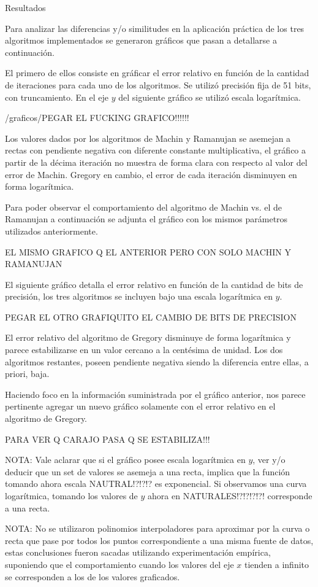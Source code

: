 \begin{section}{Resultados}

	Para analizar las diferencias y/o similitudes en la aplicación práctica de los tres algoritmos implementados se generaron gráficos que pasan a detallarse a continuación. 
		
	El primero de ellos consiste en gráficar el error relativo en función de la cantidad de iteraciones para cada uno de los algoritmos. Se utilizó precisión fija de 51 bits, con truncamiento. En el eje $y$ del siguiente gráfico se utilizó escala logarítmica.

	/graficos/PEGAR EL FUCKING GRAFICO!!!!!!

	Los valores dados por los algoritmos de Machin y Ramanujan se asemejan a rectas con pendiente negativa con diferente constante multiplicativa, el gráfico a partir de la décima iteración no muestra de forma clara con respecto al valor del error de Machin. Gregory en cambio, el error de cada iteración disminuyen en forma logarítmica.
	
	Para poder observar el comportamiento del algoritmo de Machin vs. el de Ramanujan a continuación se adjunta el gráfico con los mismos parámetros utilizados anteriormente.

	EL MISMO GRAFICO Q EL ANTERIOR PERO CON SOLO MACHIN Y RAMANUJAN

	El siguiente gráfico detalla el error relativo en función de la cantidad de bits de precisión, los tres algoritmos se incluyen bajo una escala logarítmica en $y$. 

	PEGAR EL OTRO GRAFIQUITO EL CAMBIO DE BITS DE PRECISION

	El error relativo del algoritmo de Gregory disminuye de forma logarítmica y parece estabilizarse en un valor cercano a la centésima de unidad. Los dos algoritmos restantes, poseen pendiente negativa siendo la diferencia entre ellas, a priori, baja.
	
	Haciendo foco en la información suministrada por el gráfico anterior, nos parece pertinente agregar un nuevo gráfico solamente con el error relativo en el algoritmo de Gregory.
	
	PARA VER Q CARAJO PASA Q SE ESTABILIZA!!!

	NOTA: Vale aclarar que si el gráfico posee escala logarítmica en $y$, ver y/o deducir que un set de valores se asemeja a una recta, implica que la función tomando ahora escala NAUTRAL!?!?!? es exponencial. Si observamos una curva logarítmica, tomando los valores de $y$ ahora en NATURALES!?!?!?!?! corresponde a una recta.
	
	NOTA: No se utilizaron polinomios interpoladores para aproximar por la curva o recta que pase por todos los puntos correspondiente a una misma fuente de datos, estas conclusiones fueron sacadas utilizando experimentación empírica, suponiendo que el comportamiento cuando los valores del eje $x$ tienden a infinito se corresponden a los de los valores graficados.

\end{section}
